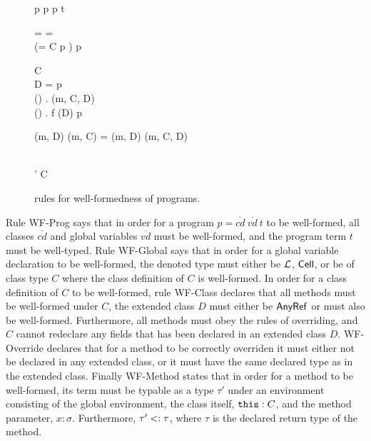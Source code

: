 \begin{figure}[]
  {p \vdash {} \andalso p \vdash {} \andalso
  }
  {p \vdash {} \:  \: t}

  \RuleSpace{}

  {\sigma = \LatType \lor \sigma = \CellType ~ \lor  \\
  (\sigma = C \land p \vdash {})}
  {p \vdash {}}
  
  \RuleSpace{}

  {C \vdash {} \\ D = \AnyRefType{} \lor
  p \vdash {} \\
  \forall () \in {} . \: \override(m,
  C, D) \\
  \forall () \in {} . \: f \notin \fields(D) }
  {p \vdash {}}

  \RuleSpace{}

  {\mtype(m, D) \lor \mtype(m, C) = \mtype(m, D)}
  {\override(m, C, D)}
  
  \RuleSpace{}

  {  \\
  \tau' \stof \tau}
  {C \vdash {}}
  \caption{\RACL{} rules for well-formedness of programs.}
  \label{fig:wf_typing}
\end{figure}


Rule {\sc WF-Prog} says that in order for a program $p =
\overline{cd}~\overline{vd}~t$ to be well-formed, all classes $\overline{cd}$
and
global variables $\overline{vd}$ must be well-formed, and the program term $t$
must be well-typed.
Rule {\sc WF-Global} says that in order for a global variable declaration to be
well-formed, the denoted type must either be $\mbox{$\mathcal{L}$}$, $\mbox{$\mathsf{Cell}$}$, or be of
class type $C$ where the class definition of $C$ is well-formed. In order for a
class definition of $C$ to be well-formed, rule {\sc WF-Class} declares that all
methods must be well-formed under $C$, the extended class $D$ must either be
$\mbox{$\mathsf{AnyRef}$}$ or must also be well-formed. Furthermore, all methods must obey the
rules of overriding, and $C$ cannot redeclare any fields that has been declared
in an extended class $D$. {\sc WF-Override} declares that for a method to be
correctly overriden it must either not be declared in any extended class, or it
must have the same declared type as in the extended class. Finally {\sc
WF-Method} states that in order for a method to be well-formed, its term must be
typable as a type $\tau'$ under an environment consisting of the global
environment, the class itself, $\mbox{\mdseries\texttt{this}} : C$, and the method parameter, $x: \sigma$.
Furthermore, $\tau' <: \tau$, where $\tau$ is the declared return type of the
method.



